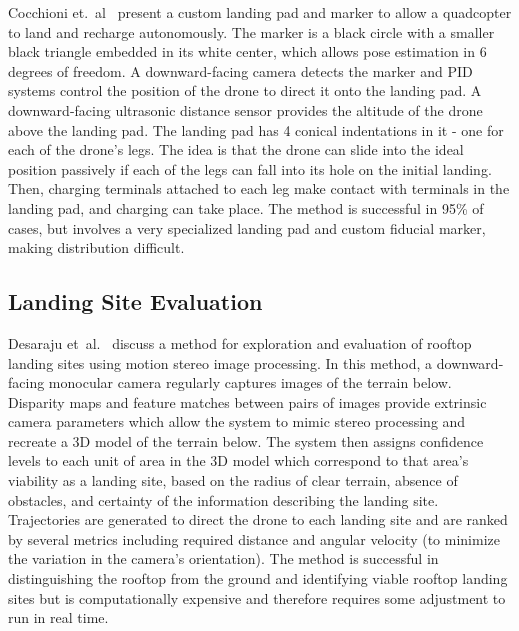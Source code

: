 Cocchioni et.~al~\cite{autonomous_landing_and_recharge} present a custom landing pad and marker to allow a quadcopter to land and recharge autonomously. The marker is a black circle with a smaller black triangle embedded in its white center, which allows pose estimation in 6 degrees of freedom. A downward-facing camera detects the marker and PID systems control the position of the drone to direct it onto the landing pad. A downward-facing ultrasonic distance sensor provides the altitude of the drone above the landing pad. The landing pad has 4 conical indentations in it - one for each of the drone's legs. The idea is that the drone can slide into the ideal position passively if each of the legs can fall into its hole on the initial landing. Then, charging terminals attached to each leg make contact with terminals in the landing pad, and charging can take place. The method is successful in 95\% of cases, but involves a very specialized landing pad and custom fiducial marker, making distribution difficult.

\subsection{Landing Site Evaluation}

Desaraju et~al.~\cite{rooftop_landing} discuss a method for exploration and evaluation of rooftop landing sites using motion stereo image processing. In this method, a downward-facing monocular camera regularly captures images of the terrain below. Disparity maps and feature matches between pairs of images provide extrinsic camera parameters which allow the system to mimic stereo processing and recreate a 3D model of the terrain below. The system then assigns confidence levels to each unit of area in the 3D model which correspond to that area's viability as a landing site, based on the radius of clear terrain, absence of obstacles, and certainty of the information describing the landing site. Trajectories are generated to direct the drone to each landing site and are ranked by several metrics including required distance and angular velocity (to minimize the variation in the camera's orientation). The method is successful in distinguishing the rooftop from the ground and identifying viable rooftop landing sites but is computationally expensive and therefore requires some adjustment to run in real time.

